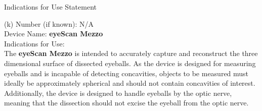 \newpage
{}

\begin{center}
  \Large{Indications for Use Statement}\\[.5in]
\end{center}


\onehalfspacing

(k) Number (if known): N/A \\
Device Name: \textbf{eyeScan Mezzo} \\
Indications for Use: \\

The \textbf{eyeScan Mezzo} is intended to accurately capture and
reconstruct the three dimensional surface of dissected eyeballs. As
the device is designed for measuring eyeballs and is incapable of
detecting concavities, objects to be measured must ideally be
approximately spherical and should not contain concavities of
interest. Additionally, the device is designed to handle eyeballs by
the optic nerve, meaning that the dissection should not excise the
eyeball from the optic nerve.

